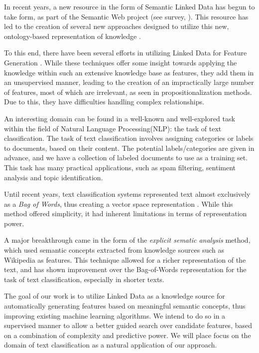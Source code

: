 \documentclass[12pt, a4paper]{article}
\theoremstyle{definition}
\begin{document}
In recent years, a new resource in the form of Semantic Linked Data has begun to take form, as part of the Semantic Web project (see survey, \citet{bizer2009linked}). This resource has led to the creation of several new approaches designed to utilize this new, ontology-based representation of knowledge \citep{losch2012graph,rios2014statistical}.

To this end, there have been several efforts in utilizing Linked Data for Feature Generation \citep{cheng2011automated, paulheim2012unsupervised}. While these techniques offer some insight towards applying the knowledge within such an extensive knowledge base as features, they add them in an unsupervised manner, leading to the creation of an impractically large number of features, most of which are irrelevant, as seen in propositionalization methods. Due to this, they have difficulties handling complex relationships.


An interesting domain can be found in a well-known and well-explored task within the field of Natural Language Processing(NLP): the task of text classification.
The task of text classification involves assigning categories or labels to documents, based on their content. The potential labels/categories are given in advance, and we have a collection of labeled documents to use as a training set. This task has many practical applications, such as spam filtering, sentiment analysis and topic identification.

Until recent years, text classification systems represented text almost exclusively as a \emph{Bag of Words}, thus creating a vector space representation \citep{salton1983introduction,Wu:1981:CST:1013228.511759}. While this method offered simplicity, it had inherent limitations in terms of representation power.

A major breakthrough came in the form of the \emph{explicit sematic analysis} \citep{gabrilovich2006overcoming} method, which used semantic concepts extracted from knowledge sources such as Wikipedia as features. This technique allowed for a richer representation of the text, and has shown improvement over the Bag-of-Words representation for the task of text classification, especially in shorter texts.

The goal of our work is to utilize Linked Data as a knowledge source for automatically generating features based on meaningful semantic concepts, thus improving existing machine learning algorithms. We intend to do so in a supervised manner to allow a better guided search over candidate features, based on a combination of complexity and predictive power. We will place focus on the domain of text classification as a natural application of our approach.
\end{document}
